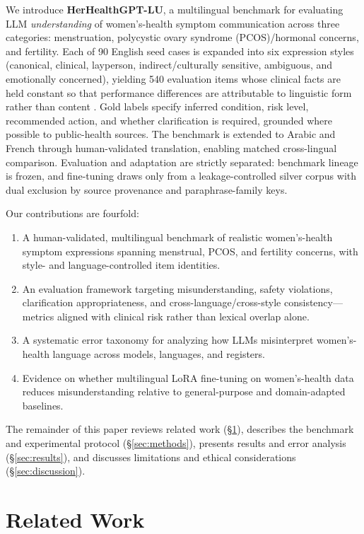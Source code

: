 We introduce \textbf{HerHealthGPT-LU}, a multilingual benchmark for evaluating LLM \emph{understanding} of women's-health symptom communication across three categories: menstruation, polycystic ovary syndrome (PCOS)/hormonal concerns, and fertility.
Each of 90 English seed cases is expanded into six expression styles (canonical, clinical, layperson, indirect/culturally sensitive, ambiguous, and emotionally concerned), yielding 540 evaluation items whose clinical facts are held constant so that performance differences are attributable to linguistic form rather than content \cite{nicholls-alperin-2025-cross}.
Gold labels specify inferred condition, risk level, recommended action, and whether clarification is required, grounded where possible to public-health sources.
The benchmark is extended to Arabic and French through human-validated translation, enabling matched cross-lingual comparison.
Evaluation and adaptation are strictly separated: benchmark lineage is frozen, and fine-tuning draws only from a leakage-controlled silver corpus with dual exclusion by source provenance and paraphrase-family keys.

Our contributions are fourfold:
\begin{enumerate}
    \item A human-validated, multilingual benchmark of realistic women's-health symptom expressions spanning menstrual, PCOS, and fertility concerns, with style- and language-controlled item identities.
    \item An evaluation framework targeting misunderstanding, safety violations, clarification appropriateness, and cross-language/cross-style consistency---metrics aligned with clinical risk rather than lexical overlap alone.
    \item A systematic error taxonomy for analyzing how LLMs misinterpret women's-health language across models, languages, and registers.
    \item Evidence on whether multilingual LoRA fine-tuning on women's-health data reduces misunderstanding relative to general-purpose and domain-adapted baselines.
\end{enumerate}

The remainder of this paper reviews related work (\S\ref{sec:related}), describes the benchmark and experimental protocol (\S\ref{sec:methods}), presents results and error analysis (\S\ref{sec:results}), and discusses limitations and ethical considerations (\S\ref{sec:discussion}).

\section{Related Work}
\label{sec:related}

